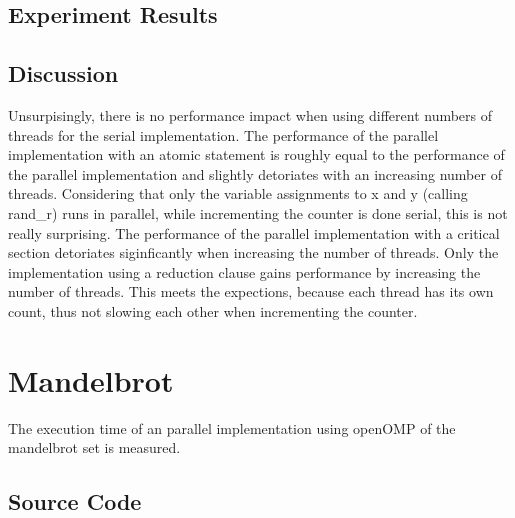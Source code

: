 \documentclass[parskip]{scrartcl}
\begin{document}
	\subsection{Experiment Results}

	\subsection{Discussion}
	Unsurpisingly, there is no performance impact when using different numbers of threads for the serial implementation. The performance of the parallel implementation with an atomic statement is roughly equal to the performance of the parallel implementation and slightly detoriates with an increasing number of threads. Considering that only  the variable assignments to x and y (calling rand\_r) runs in parallel, while incrementing the counter is done serial, this is not really surprising. The performance of the parallel implementation with a critical section detoriates siginficantly when increasing the number of threads. Only the implementation using a reduction clause gains performance by increasing the number of threads. This meets the expections, because each thread has its own count, thus not slowing each other when incrementing the counter.
	
	\section{Mandelbrot}
	
	The execution time of an parallel implementation using openOMP of the mandelbrot set is measured.
	
	\subsection{Source Code}
	\inputminted	[linenos]{c}{ex2/mandelbrot.c}
	
\end{document}
